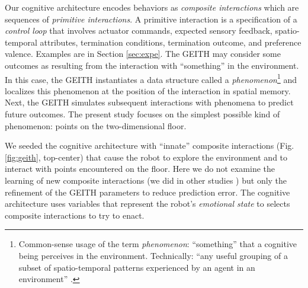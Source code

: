 \documentclass[runningheads]{llncs}
\begin{document}
Our cognitive architecture encodes behaviors as \textit{composite interactions} which are sequences of \textit{primitive interactions}.
A primitive interaction is a specification of a \textit{control loop} that involves actuator commands, expected sensory feedback, spatio-temporal attributes, termination conditions, termination outcome, and preference valence. 
Examples are in Section \ref{sec:expe}. 
The GEITH may consider some outcomes as resulting from the interaction with ``something'' in the environment.
In this case, the GEITH instantiates a data structure called a \textit{phenomenon}\footnote{Common-sense usage of the term \textit{phenomenon}: ``something'' that a cognitive being perceives in the environment. Technically: ``any useful grouping of a subset of spatio-temporal patterns experienced by an agent in an environment'' \cite[p. 8]{thorisson_explanation_2021}.} and localizes this phenomenon at the position of the interaction in spatial memory.
Next, the GEITH simulates subsequent interactions with phenomena to predict future outcomes. 
The present study focuses on the simplest possible kind of phenomenon: points on the two-dimensional floor.

We seeded the cognitive architecture with ``innate'' composite interactions (Fig. \ref{fig:geith}, top-center) that cause the robot to explore the environment and to interact with points encountered on the floor. 
Here we do not examine the learning of new composite interactions (we did in other studies \cite{georgeon_cash_2019}) but only the refinement of the GEITH parameters to reduce prediction error.
The cognitive architecture uses variables that represent the robot's \textit{emotional state} to selects composite interactions to try to enact.
\end{document}
